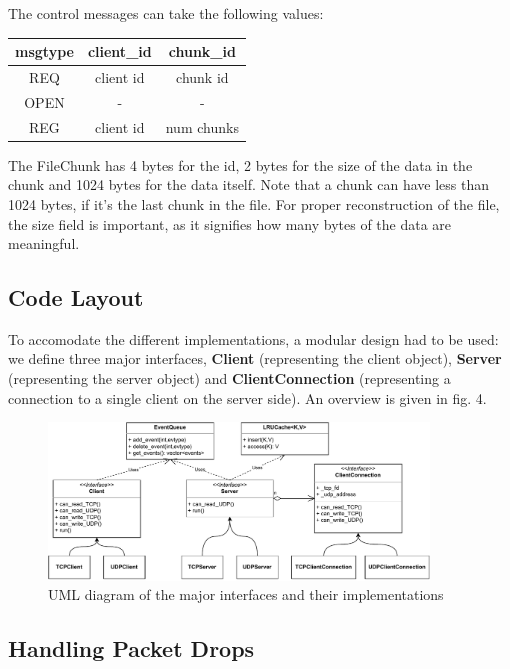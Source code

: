 \documentclass[12pt]{article}
\newcommand\la{\textlangle\xspace}  %
\newcommand\ra{\textrangle\xspace}
\begin{document}
The control messages can take the following values:
\begin{center}
\begin{tabular}{|c|c|c|}
\hline
msgtype & client\_id & chunk\_id \\
\hline
REQ     & \la client id \ra & \la chunk id \ra \\
OPEN    &     -     &     -    \\
REG     & \la client id \ra & \la num chunks \ra \\
\hline
\end{tabular}
\end{center}

The FileChunk has 4 bytes for the id, 2 bytes for the size of the data in the chunk and 1024 bytes for the data itself. Note that a chunk can have less than 1024 bytes, if it's the last chunk in the file. For proper reconstruction of the file, the size field is important, as it signifies how many bytes of the data are meaningful.

\subsection{Code Layout}

To accomodate the different implementations, a modular design had to be used: we define three major interfaces, \textbf{Client} (representing the client object), \textbf{Server} (representing the server object) and \textbf{ClientConnection} (representing a connection to a single client on the server side). An overview is given in fig. 4.

\begin{figure}[H]
  \centering
  \includegraphics[width=0.9\textwidth]{uml.pdf}
  \caption{UML diagram of the major interfaces and their implementations}
\end{figure}


\subsection{Handling Packet Drops}
\end{document}
